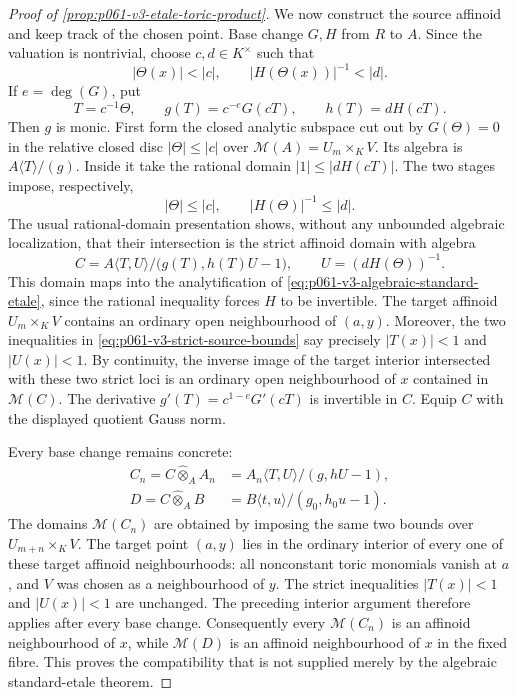 \begin{proof}[Proof of \cref{prop:p061-v3-etale-toric-product}]
We now construct the source affinoid and keep track of the chosen point.
Base change \(G,H\) from \(R\) to \(A\). Since the valuation is
nontrivial, choose \(c,d\in K^\times\) such that
\begin{equation}\label{eq:p061-v3-strict-source-bounds}
             |\Theta(x)|<|c|,
 \qquad |H(\Theta(x))|^{-1}<|d|.
\end{equation}
If \(e=\deg(G)\), put
\[
       T=c^{-1}\Theta,
 \qquad g(T)=c^{-e}G(cT),
 \qquad h(T)=dH(cT).
\]
Then \(g\) is monic. First form the closed analytic subspace cut out by
\(G(\Theta)=0\) in the relative closed disc \(|\Theta|\leq|c|\) over
\(\mathcal M(A)=U_m\times_KV\). Its algebra is
\(A\langle T\rangle/(g)\). Inside it
take the rational domain \(|1|\leq|dH(cT)|\). The two stages impose,
respectively,
\[
                 |\Theta|\leq|c|,
 \qquad |H(\Theta)|^{-1}\leq|d|.
\]
The usual rational-domain presentation shows, without any
unbounded algebraic localization, that their intersection is the strict
affinoid domain with algebra
\begin{equation}\label{eq:p061-v3-constructed-source-algebra}
 C=A\langle T,U\rangle/
       \bigl(g(T),h(T)U-1\bigr),
 \qquad U=(dH(\Theta))^{-1}.
\end{equation}
This domain maps into the analytification of
\eqref{eq:p061-v3-algebraic-standard-etale}, since the rational inequality
forces \(H\) to be invertible. The target affinoid
\(U_m\times_KV\) contains an ordinary open neighbourhood of \((a,y)\).
Moreover, the two inequalities in
\eqref{eq:p061-v3-strict-source-bounds} say precisely
\(|T(x)|<1\) and \(|U(x)|<1\). By continuity, the inverse image of the
target interior intersected with these two strict loci is an ordinary open
neighbourhood of \(x\) contained in \(\mathcal M(C)\). The derivative
\(g'(T)=c^{1-e}G'(cT)\) is invertible in \(C\). Equip \(C\) with the
displayed quotient Gauss norm.

Every base change remains concrete:
\begin{align}
 C_n=C\widehat\otimes_AA_n
   &=A_n\langle T,U\rangle/(g,hU-1),
 \label{eq:p061-v3-source-base-change}\\
 D=C\widehat\otimes_AB
   &=B\langle t,u\rangle/(g_0,h_0u-1).
 \label{eq:p061-v3-fixed-fibre-algebra}
\end{align}
The domains \(\mathcal M(C_n)\) are obtained by imposing the same two
bounds over \(U_{m+n}\times_KV\). The target point \((a,y)\) lies in the
ordinary interior of every one of these target affinoid neighbourhoods:
all nonconstant toric monomials vanish at \(a\), and \(V\) was chosen as a
neighbourhood of \(y\). The strict inequalities \(|T(x)|<1\) and
\(|U(x)|<1\) are unchanged. The preceding interior argument therefore
applies after every base change. Consequently every
\(\mathcal M(C_n)\) is an affinoid neighbourhood of \(x\), while
\(\mathcal M(D)\) is an affinoid neighbourhood of \(x\) in the fixed
fibre. This proves the compatibility that is not supplied merely by the
algebraic standard-etale theorem.


\end{proof}
